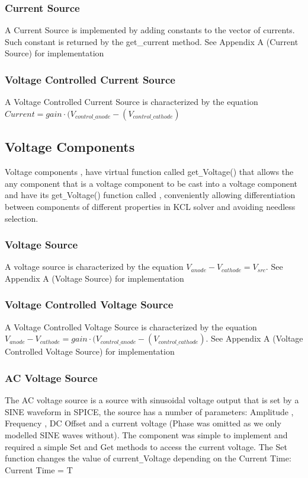 \documentclass{article}
\begin{document}
\subsubsection{Current Source}
A Current Source is implemented by adding constants to the vector of currents. Such constant is returned by the get\_current method.\bigbreak
See Appendix A (Current Source) for implementation
\subsubsection{Voltage Controlled Current Source}
A Voltage Controlled Current Source is characterized by the equation $ Current = gain\cdot(V_{control\_anode}-(V_{control\_cathode})$
\subsection{Voltage Components}
Voltage components , have virtual function called get\verb|_|Voltage() that allows the any component that is a voltage component to be cast into a voltage component and have its get\verb|_|Voltage() function called , conveniently allowing differentiation between components of different properties in KCL solver and avoiding needless selection.
\medbreak

\subsubsection{Voltage Source}
A voltage source is characterized by the equation $V_{anode}-V_{cathode}=V_{src}$. \bigbreak
See Appendix A (Voltage Source) for implementation

\subsubsection{Voltage Controlled Voltage Source}
A Voltage Controlled Voltage Source is characterized by the equation
$V_{anode}-V_{cathode}=gain\cdot(V_{control\_anode}-(V_{control\_cathode})$.
\bigbreak
See Appendix A (Voltage Controlled Voltage Source) for implementation


\subsubsection{AC Voltage Source}
The AC voltage source is a source with sinusoidal voltage output that is set by a SINE waveform in SPICE, the source has a number of parameters: Amplitude , Frequency , DC Offset and a current voltage (Phase was omitted as we only modelled SINE waves without). The component was simple to implement and required a simple Set and Get methods to access the current voltage. 
The Set function changes the value of current\verb|_|Voltage depending on the Current Time: Current Time = T
\medbreak
\end{document}
